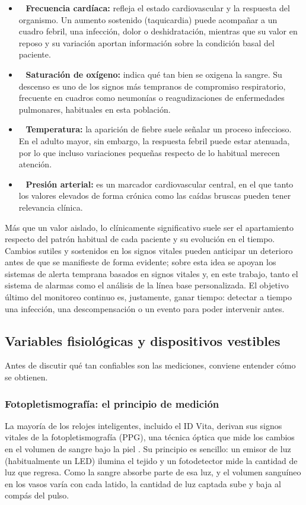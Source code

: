 \begin{itemize}
\item~ \textbf{Frecuencia cardíaca:} refleja el estado cardiovascular y la respuesta del organismo. Un aumento sostenido (taquicardia) puede acompañar a un cuadro febril, una infección, dolor o deshidratación, mientras que su valor en reposo y su variación aportan información sobre la condición basal del paciente.
\item~ \textbf{Saturación de oxígeno:} indica qué tan bien se oxigena la sangre. Su descenso es uno de los signos más tempranos de compromiso respiratorio, frecuente en cuadros como neumonías o reagudizaciones de enfermedades pulmonares, habituales en esta población.
\item~ \textbf{Temperatura:} la aparición de fiebre suele señalar un proceso infeccioso. En el adulto mayor, sin embargo, la respuesta febril puede estar atenuada, por lo que incluso variaciones pequeñas respecto de lo habitual merecen atención.
\item~ \textbf{Presión arterial:} es un marcador cardiovascular central, en el que tanto los valores elevados de forma crónica como las caídas bruscas pueden tener relevancia clínica.
\end{itemize}
Más que un valor aislado, lo clínicamente significativo suele ser el apartamiento respecto del patrón habitual de cada paciente y su evolución en el tiempo. Cambios sutiles y sostenidos en los signos vitales pueden anticipar un deterioro antes de que se manifieste de forma evidente; sobre esta idea se apoyan los sistemas de alerta temprana basados en signos vitales y, en este trabajo, tanto el sistema de alarmas como el análisis de la línea base personalizada. El objetivo último del monitoreo continuo es, justamente, ganar tiempo: detectar a tiempo una infección, una descompensación o un evento para poder intervenir antes.\\


\subsection{Variables fisiológicas y dispositivos vestibles}
Antes de discutir qué tan confiables son las mediciones, conviene entender cómo se obtienen.\\


\subsubsection{Fotopletismografía: el principio de medición}
La mayoría de los relojes inteligentes, incluido el ID Vita, derivan sus signos vitales de la fotopletismografía (PPG), una técnica óptica que mide los cambios en el volumen de sangre bajo la piel \cite{bent2020}. Su principio es sencillo: un emisor de luz (habitualmente un LED) ilumina el tejido y un fotodetector mide la cantidad de luz que regresa. Como la sangre absorbe parte de esa luz, y el volumen sanguíneo en los vasos varía con cada latido, la cantidad de luz captada sube y baja al compás del pulso.\\

